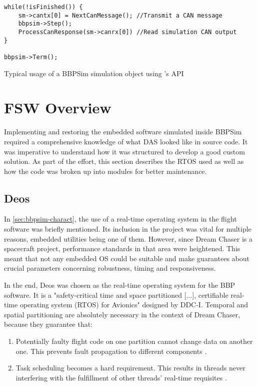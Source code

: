 {\begin{listing}[H]
\begin{verbatim}
while(!isFinished()) {
	sm->cantx[0] = NextCanMessage(); //Transmit a CAN message
	bbpsim->Step();
	ProcessCanResponse(sm->canrx[0]) //Read simulation CAN output
}

bbpsim->Term();
	\end{verbatim}
	\caption{Typical usage of a BBPSim simulation object using 's API}
	\label{code:example-bbpsim-usage}
\end{listing}

\section{FSW Overview}\label{sec:fsw-outline}
Implementing and restoring the embedded software simulated inside \gls{BBPSim} required a comprehensive knowledge of what DAS looked like in source code. It was imperative to understand how it was structured to develop a good custom solution.  As part of the effort, this section describes the RTOS used as well as how the code was broken up into modules for better maintenance.

\subsection*{Deos}
In \autoref{sec:bbpsim-charact}, the use of a real-time operating system in the flight software was briefly mentioned. Its inclusion in the project was vital for multiple reasons, embedded utilities being one of them. However, since Dream Chaser is a spacecraft project, performance standards in that area were heightened. This meant that not any embedded OS could be suitable and make guarantees about crucial parameters concerning robustness, timing and responsiveness.

In the end, Deos was chosen as the real-time operating system for the BBP software. It is a "safety-critical time and space partitioned [...], certifiable real-time operating system (RTOS) for Avionics" designed by DDC-I\cite{on:ddci}. Temporal and spatial partitioning are absolutely necessary in the context of Dream Chaser, because they guarantee that:
\begin{enumerate}
	\item Potentially faulty flight code on one partition cannot change data on another one. This prevents fault propagation to different components \cite{reiger}.
	\item Task scheduling becomes a hard requirement. This results in threads never interfering with the fulfillment of other threads' real-time requisites \cite{rufino}.
\end{enumerate}

}
